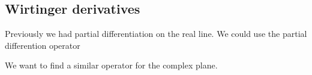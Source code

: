
\subsection{Wirtinger derivatives}

Previously we had partial differentiation on the real line. We could use the partial differention operator

We want to find a similar operator for the complex plane.

